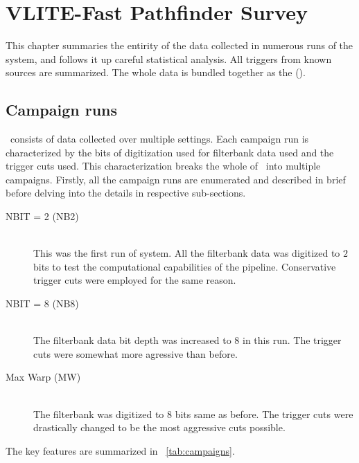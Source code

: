 \chapter{VLITE-Fast Pathfinder Survey}
\label{ch:data}

\par This chapter summaries the entirity of the data collected in numerous runs of the \vf system, and follows it up careful statistical analysis. All triggers from known sources are summarized. The whole data is bundled together as the  (\vfps).

\section {Campaign runs}
\label{sec:camp}

\par \vfps~consists of data collected over multiple settings. 
Each campaign run is characterized by the bits of digitization used for filterbank data used and the trigger cuts used. 
This characterization breaks the whole of \vfps~into multiple campaigns. 
Firstly, all the campaign runs are enumerated and described in brief before delving into the details in respective sub-sections.
\begin{description}
	\item[NBIT = 2 (NB2)] \\
		This was the first run of \vfps system. All the filterbank data was digitized to $2$ bits to test the computational capabilities of the pipeline. Conservative trigger cuts were employed for the same reason.
	\item[NBIT = 8 (NB8)] \\
		The filterbank data bit depth was increased to $8$ in this run. The trigger cuts were somewhat more agressive than before.
	\item[Max Warp (MW)] \\
		The filterbank was digitized to $8$ bits same as before.
		The trigger cuts were drastically changed to be the most aggressive cuts possible. 
\end{description}

The key features are summarized in ~\autoref{tab:campaigns}.

